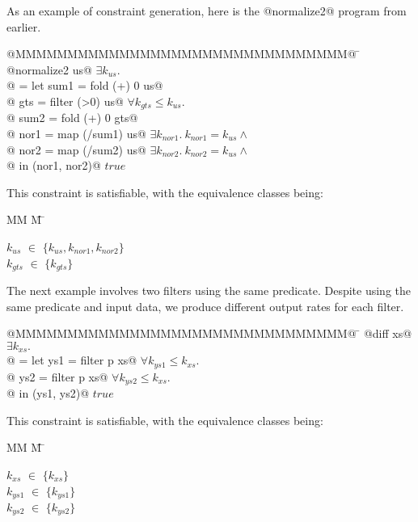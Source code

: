 As an example of constraint generation, here is the @normalize2@ program from earlier.
\begin{tabbing}
@MMMMMMMMMMMMMMMMMMMMMMMMMMMMMMMM@  \= \kill
@normalize2 us@                     \> $\exists k_{us}.$      \\
@ = let sum1 = fold   (+) 0 us@     \>                      \\
@       gts  = filter (>0)  us@     \> $\forall k_{gts} \le k_{us}.$ \\
@       sum2 = fold   (+) 0 gts@    \> \\
@       nor1 = map  (/sum1) us@     \> $\exists k_{nor1}.\ k_{nor1} = k_{us} \wedge$ \\
@       nor2 = map  (/sum2) us@     \> $\exists k_{nor2}.\ k_{nor2} = k_{us} \wedge$ \\
@   in (nor1, nor2)@                \> $true$ \\
\end{tabbing}
This constraint is satisfiable, with the equivalence classes being:
\newcommand{\eqclasses}[1]{
    \begin{tabbing}
        MM \= M \= \kill
        #1
    \end{tabbing}}
\newcommand{\eqclass}[2]{$#1$ \> $\in$ \> $\{#2\}$ \\}
\eqclasses{
    \eqclass{k_{us}}{k_{us}, k_{nor1}, k_{nor2}}
    \eqclass{k_{gts}}{k_{gts}}
}

The next example involves two filters using the same predicate.
Despite using the same predicate and input data, we produce different output rates for each filter.
\begin{tabbing}
@MMMMMMMMMMMMMMMMMMMMMMMMMMMMMMMM@  \= \kill
@diff xs@                           \> $\exists k_{xs}.$ \\
@ = let ys1 = filter p xs@          \> $\forall k_{ys1} \le k_{xs}.$       \\
@       ys2 = filter p xs@          \> $\forall k_{ys2} \le k_{xs}.$       \\
@   in (ys1, ys2)@                  \> $true$                   \\
\end{tabbing}

This constraint is satisfiable, with the equivalence classes being:
\eqclasses{
    \eqclass{k_{xs}}    {k_{xs}}
    \eqclass{k_{ys1}}   {k_{ys1}}
    \eqclass{k_{ys2}}   {k_{ys2}}
}

